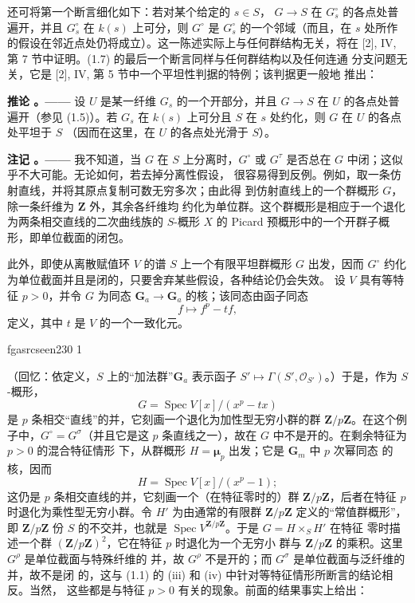 \documentclass[12pt,twoside,openany]{book}
\numberwithin{equation}{section}
\newcommand{\fgaunitid}{unbound}
\newcommand{\src}[1]{%
  \phantomsection
  \hypertarget{src:\fgaunitid:#1}{}%
  \hypertarget{fga.\fgaunitid.p#1}{}%
  \ifcsname fgasrcseen#1\endcsname\else
    \expandafter\gdef\csname fgasrcseen#1\endcsname{1}%
    \hypertarget{src:#1}{}%
  \fi
  \marginpar{\raggedleft\footnotesize\sffamily #1}%
}
\theoremstyle{plain}
\theoremstyle{definition}
\theoremstyle{remark}
\newcommand{\result}[2]{%
  \par\medskip\noindent\textbf{#1%
  \if\relax\detokenize{#2}\relax\else\space#2\fi。——}\enspace
}
\begin{document}
还可将第一个断言细化如下：若对某个给定的 $s\in S$，
$G\longrightarrow S$ 在 $G_s^\circ$ 的各点处普遍开，并且 $G_s^\circ$ 在
$k(s)$ 上可分，则 $G^\circ$ 是 $G_s^\circ$ 的一个邻域（而且，在 $s$
处所作的假设在邻近点处仍将成立）。这一陈述实际上与任何群结构无关，将在
[2], IV, 第 7 节中证明。(1.7) 的最后一个断言同样与任何群结构以及任何连通
分支问题无关，它是 [2], IV, 第 5 节中一个平坦性判据的特例；该判据更一般地
推出：

\result{推论}{1.8} 设 $U$ 是某一纤维 $G_s$ 的一个开部分，并且
$G\longrightarrow S$ 在 $U$ 的各点处普遍开（参见 (1.5)）。若 $G_s$ 在
$k(s)$ 上可分且 $S$ 在 $s$ 处约化，则 $G$ 在 $U$ 的各点处平坦于 $S$
（因而在这里，在 $U$ 的各点处光滑于 $S$）。

\result{注记}{1.9} 我不知道，当 $G$ 在 $S$ 上分离时，$G^\circ$ 或
$G^\tau$ 是否总在 $G$ 中闭；这似乎不大可能。无论如何，若去掉分离性假设，
很容易得到反例。例如，取一条仿射直线，并将其原点复制可数无穷多次；由此得
到仿射直线上的一个群概形 $G$，除一条纤维为 $\mathbf Z$ 外，其余各纤维均
约化为单位群。这个群概形是相应于一个退化为两条相交直线的二次曲线族的
$S$-概形 $X$ 的 Picard 预概形中的一个开群子概形，即单位截面的闭包。

此外，即使从离散赋值环 $V$ 的谱 $S$ 上一个有限平坦群概形 $G$ 出发，因而
$G^\circ$ 约化为单位截面并且是闭的，只要舍弃某些假设，各种结论仍会失效。
设 $V$ 具有等特征 $p>0$，并令 $G$ 为同态
$\mathbf G_a\longrightarrow\mathbf G_a$ 的核；该同态由函子同态
\[
f\longmapsto f^p-tf,
\]
定义，其中 $t$ 是 $V$ 的一个一致化元。

\src{230}
（回忆：依定义，$S$ 上的“加法群”$\mathbf G_a$ 表示函子
$S'\longmapsto\Gamma(S',\mathcal O_{S'})$。）于是，作为 $S$-概形，
\[
G=\operatorname{Spec}V[x]/(x^p-tx)
\]
是 $p$ 条相交“直线”的并，它刻画一个退化为加性型无穷小群的群
$\mathbf Z/p\mathbf Z$。在这个例子中，$G^\circ=G^\sigma$（并且它是这
$p$ 条直线之一），故在 $G$ 中不是开的。在剩余特征为 $p>0$ 的混合特征情形
下，从群概形 $H=\symbf{\mu}_p$ 出发；它是 $\mathbf G_m$ 中 $p$ 次幂同态
的核，因而
\[
H=\operatorname{Spec}V[x]/(x^p-1) ;
\]
这仍是 $p$ 条相交直线的并，它刻画一个（在特征零时的）群
$\mathbf Z/p\mathbf Z$，后者在特征 $p$ 时退化为乘性型无穷小群。令 $H'$
为由通常的有限群 $\mathbf Z/p\mathbf Z$ 定义的“常值群概形”，即
$\mathbf Z/p\mathbf Z$ 份 $S$ 的不交并，也就是
$\operatorname{Spec}V^{\mathbf Z/p\mathbf Z}$。于是 $G=H\times_S H'$ 在特征
零时描述一个群 $(\mathbf Z/p\mathbf Z)^2$，它在特征 $p$ 时退化为一个无穷小
群与 $\mathbf Z/p\mathbf Z$ 的乘积。这里 $G^\rho$ 是单位截面与特殊纤维的
并，故 $G^\rho$ 不是开的；而 $G^\sigma$ 是单位截面与泛纤维的并，故不是闭
的，这与 (1.1) 的 (iii) 和 (iv) 中针对等特征情形所断言的结论相反。当然，
这些都是与特征 $p>0$ 有关的现象。前面的结果事实上给出：
\end{document}
